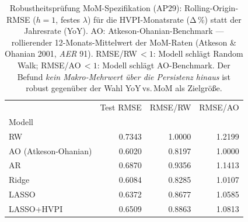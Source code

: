 \begin{table}
\caption{Robustheitsprüfung MoM-Spezifikation (AP29): Rolling-Origin-RMSE ($h=1$, festes $\lambda$) für die HVPI-Monatsrate (Δ\,\%) statt der Jahresrate (YoY). AO: Atkeson-Ohanian-Benchmark --- rollierender 12-Monats-Mittelwert der MoM-Raten (Atkeson \& Ohanian 2001, \emph{AER} 91). RMSE/RW\,$<1$: Modell schlägt Random Walk; RMSE/AO\,$<1$: Modell schlägt AO-Benchmark. Der Befund \emph{kein Makro-Mehrwert über die Persistenz hinaus} ist robust gegenüber der Wahl YoY\,vs.\,MoM als Zielgröße.}
\label{tab:robustheit_mom}
\begin{tabular}{lrrr}
\toprule
 & Test RMSE & RMSE/RW & RMSE/AO \\
Modell &  &  &  \\
\midrule
RW & 0.7343 & 1.0000 & 1.2199 \\
AO (Atkeson-Ohanian) & 0.6020 & 0.8197 & 1.0000 \\
AR & 0.6870 & 0.9356 & 1.1413 \\
Ridge & 0.6084 & 0.8285 & 1.0107 \\
LASSO & 0.6372 & 0.8677 & 1.0585 \\
LASSO+HVPI & 0.6509 & 0.8863 & 1.0813 \\
\bottomrule
\end{tabular}
\end{table}
